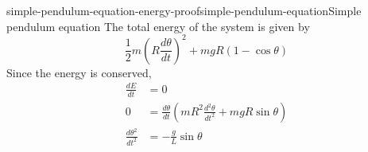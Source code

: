 \documentclass[preview]{standalone}
\begin{document}

\begin{snippetproof}{simple-pendulum-equation-energy-proof}{simple-pendulum-equation}{Simple pendulum equation}
    The total energy of the system is given by
    \[
        \frac{1}{2}m {\left(R\frac{d\theta}{dt}\right)}^2
        + mgR(1-\cos\theta)
    \]
    Since the energy is conserved,
    \begin{align*}
        \frac{dE}{dt} &= 0 \\
        0 &= \frac{d\theta}{dt}\left(mR^2 \frac{d^2\theta}{dt^2} + mgR\sin\theta\right) \\
        \frac{d\theta^2}{dt^2} &= -\frac{g}{L}\sin\theta
    \end{align*}
\end{snippetproof}
\end{document}
